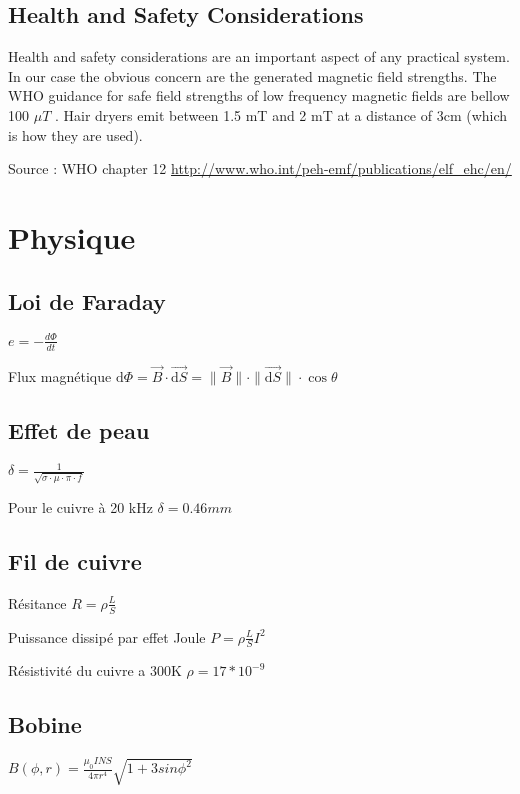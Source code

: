 \documentclass[a4paper,11pt]{article}
\begin{document}
\subsection{Health and Safety Considerations}
Health and safety considerations are an important aspect of
any practical system. In our case the obvious concern are
the generated magnetic field strengths.
The WHO guidance for safe field
strengths of low frequency magnetic fields are bellow 100 $\mu T$ .
Hair dryers emit between 1.5 mT and 2 mT at a distance of 3cm (which is how they
are used).

Source : WHO chapter 12 \url{http://www.who.int/peh-emf/publications/elf_ehc/en/}

\section{Physique}

\subsection{Loi de Faraday}

$ e = - \frac{d\Phi}{dt} $

Flux magnétique $ {\textrm  {d}}\Phi ={\vec  {B}}\cdot {\vec  {{\textrm  {d}}S}}=\|{\vec  B}\|\cdot \|{\vec  {{\textrm  {d}}S}}\|\cdot \cos \theta  $

\subsection{Effet de peau}

$ \delta = \frac {1} {\sqrt{\sigma\cdot\mu\cdot\pi\cdot f}} $

Pour le cuivre à 20 kHz $ \delta = 0.46 mm $

\subsection{Fil de cuivre}

Résitance $ R=\rho {\frac  {L}{S}} $

Puissance dissipé par effet Joule $ P=\rho {\frac  {L}{S}}I^{{2}} $ 

Résistivité du cuivre a 300K $ \rho = 17 * 10^{-9} $

\subsection{Bobine}

$ B(\phi, r) = \frac{\mu_0 INS}{4\pi r^4}\sqrt{1 + 3sin\phi^2} $
\end{document}

